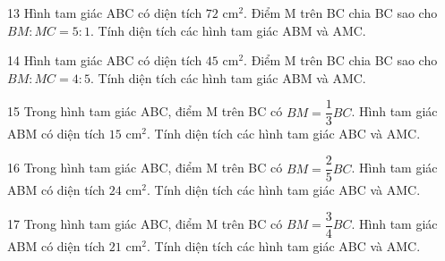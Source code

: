 \gap
\begin{probbox}{13}{\relax}
Hình tam giác ABC có diện tích $72$ cm$^2$. Điểm M trên BC chia BC sao cho $BM:MC=5:1$. Tính diện tích các hình tam giác ABM và AMC.
\end{probbox}
\gap
\begin{probbox}{14}{\relax}
Hình tam giác ABC có diện tích $45$ cm$^2$. Điểm M trên BC chia BC sao cho $BM:MC=4:5$. Tính diện tích các hình tam giác ABM và AMC.
\end{probbox}
\gap
\begin{probbox}{15}{\relax}
Trong hình tam giác ABC, điểm M trên BC có $BM=\dfrac{1}{3}BC$. Hình tam giác ABM có diện tích $15$ cm$^2$. Tính diện tích các hình tam giác ABC và AMC.
\end{probbox}
\gap
\begin{probbox}{16}{\relax}
Trong hình tam giác ABC, điểm M trên BC có $BM=\dfrac{2}{5}BC$. Hình tam giác ABM có diện tích $24$ cm$^2$. Tính diện tích các hình tam giác ABC và AMC.
\end{probbox}
\gap
\begin{probbox}{17}{\relax}
Trong hình tam giác ABC, điểm M trên BC có $BM=\dfrac{3}{4}BC$. Hình tam giác ABM có diện tích $21$ cm$^2$. Tính diện tích các hình tam giác ABC và AMC.
\end{probbox}
